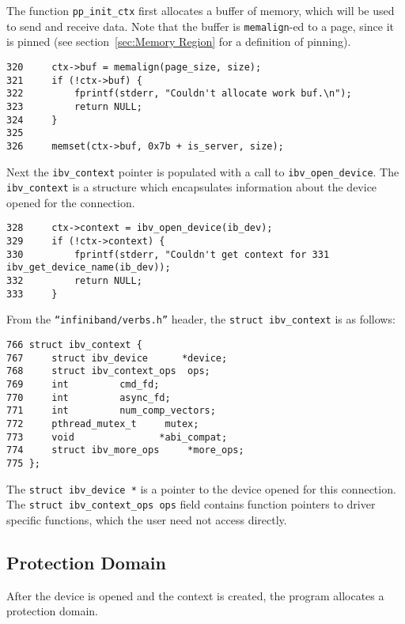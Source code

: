 \documentclass[letterpaper,12pt]{article}
\begin{document}
The function {\tt pp\_init\_ctx} first allocates a buffer of memory, which will be
used to send and receive data. Note that the buffer is {\tt memalign}-ed to
a page, since it is pinned (see section~\ref{sec:Memory Region} for a
definition of pinning).

\lstset{language=C, caption=Allocating a Buffer}
\begin{lstlisting}
320     ctx->buf = memalign(page_size, size);
321     if (!ctx->buf) {
322         fprintf(stderr, "Couldn't allocate work buf.\n");
323         return NULL;
324     }
325
326     memset(ctx->buf, 0x7b + is_server, size);
\end{lstlisting}

Next the {\tt ibv\_context} pointer is populated with a call to
{\tt ibv\_open\_device}. The {\tt ibv\_context} is a structure which
encapsulates information about the device opened for the connection.

\lstset{language=C, caption=Opening a Context}
\begin{lstlisting}
328     ctx->context = ibv_open_device(ib_dev);
329     if (!ctx->context) {
330         fprintf(stderr, "Couldn't get context for 331             ibv_get_device_name(ib_dev));
332         return NULL;
333     }
\end{lstlisting}

From the {\tt ``infiniband/verbs.h''} header, the {\tt struct ibv\_context} is as follows:
\lstset{language=C, caption=struct ibv\_context}
\begin{lstlisting}
766 struct ibv_context {
767     struct ibv_device      *device;
768     struct ibv_context_ops  ops;
769     int         cmd_fd;
770     int         async_fd;
771     int         num_comp_vectors;
772     pthread_mutex_t     mutex;
773     void               *abi_compat;
774     struct ibv_more_ops     *more_ops;
775 };
\end{lstlisting}

The {\tt struct ibv\_device *} is a pointer to the device opened for this connection. The
{\tt struct ibv\_context\_ops ops} field contains function pointers to driver specific functions,
which the user need not access directly.

\subsection{Protection Domain}
After the device is opened and the context is created,
the program allocates a protection domain.
\end{document}
